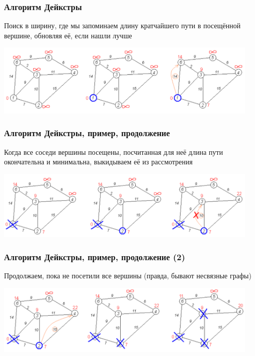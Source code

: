 \documentclass[xetex,mathserif,serif]{beamer}
\begin{document}
\begin{frame}
\begin{columns}
\begin{column}{0.35\textwidth}
\begin{center}
                \end{center}
            \end{column}
        \end{columns}
    \end{frame}

    \begin{frame}
        \frametitle{Алгоритм Дейкстры}
        Поиск в ширину, где мы запоминаем длину кратчайшего пути в посещённой вершине, обновляя её, если нашли лучше
        \begin{center}
            \includegraphics[width=0.95\textwidth]{dijkstra1.png}
        \end{center}
    \end{frame}

    \begin{frame}
        \frametitle{Алгоритм Дейкстры, пример, продолжение}
        Когда все соседи вершины посещены, посчитанная для неё длина пути окончательна и минимальна, выкидываем её из рассмотрения
        \begin{center}
            \includegraphics[width=0.95\textwidth]{dijkstra2.png}
        \end{center}
    \end{frame}

    \begin{frame}
        \frametitle{Алгоритм Дейкстры, пример, продолжение (2)}
        Продолжаем, пока не посетили все вершины (правда, бывают несвязные графы)
        \begin{center}
            \includegraphics[width=0.95\textwidth]{dijkstra3.png}
        \end{center}
    \end{frame}
\end{document}
